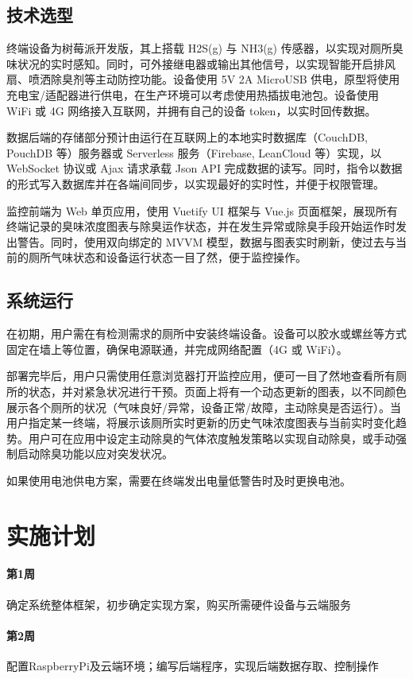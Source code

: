 \documentclass[UTF8]{ctexart}
\begin{document}
\subsection{技术选型}
终端设备为树莓派开发版，其上搭载 H2S(g) 与 NH3(g) 传感器，以实现对厕所臭味状况的实时感知。同时，可外接继电器或输出其他信号，以实现智能开启排风扇、喷洒除臭剂等主动防控功能。设备使用 5V 2A MicroUSB 供电，原型将使用充电宝/适配器进行供电，在生产环境可以考虑使用热插拔电池包。设备使用 WiFi 或 4G 网络接入互联网，并拥有自己的设备 token，以实时回传数据。

数据后端的存储部分预计由运行在互联网上的本地实时数据库（Couch\-DB, PouchDB 等）服务器或 Serverless 服务（Firebase, LeanCloud 等）实现，以 WebSocket 协议或 Ajax 请求承载 Json API 完成数据的读写。同时，指令以数据的形式写入数据库并在各端间同步，以实现最好的实时性，并便于权限管理。

监控前端为 Web 单页应用，使用 Vuetify UI 框架与 Vue.js 页面框架，展现所有终端记录的臭味浓度图表与除臭运作状态，并在发生异常或除臭手段开始运作时发出警告。同时，使用双向绑定的 MVVM 模型，数据与图表实时刷新，使过去与当前的厕所气味状态和设备运行状态一目了然，便于监控操作。
\subsection{系统运行}
在初期，用户需在有检测需求的厕所中安装终端设备。设备可以胶水或螺丝等方式固定在墙上等位置，确保电源联通，并完成网络配置（4G 或 WiFi）。

部署完毕后，用户只需使用任意浏览器打开监控应用，便可一目了然地查看所有厕所的状态，并对紧急状况进行干预。页面上将有一个动态更新的图表，以不同颜色展示各个厕所的状况（气味良好/异常，设备正常/故障，主动除臭是否运行）。当用户指定某一终端，将展示该厕所实时更新的历史气味浓度图表与当前实时变化趋势。用户可在应用中设定主动除臭的气体浓度触发策略以实现自动除臭，或手动强制启动除臭功能以应对突发状况。

如果使用电池供电方案，需要在终端发出电量低警告时及时更换电池。
\section{实施计划}
\paragraph{第1周}确定系统整体框架，初步确定实现方案，购买所需硬件设备与云端服务
\paragraph{第2周}配置RaspberryPi及云端环境；编写后端程序，实现后端数据存取、控制操作
\end{document}

